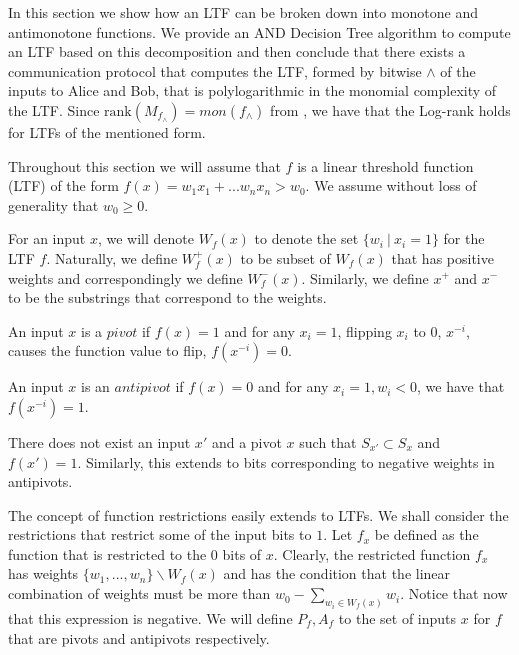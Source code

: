 In this section we show how an LTF can be broken down into monotone and antimonotone functions. We provide an AND Decision Tree algorithm to compute an LTF based on this decomposition and then conclude that there exists a communication protocol that computes the LTF, formed by bitwise $\wedge$ of the inputs to Alice and Bob, that is polylogarithmic in the monomial complexity of the LTF.  Since $\text{rank}({M_{f_{\wedge}}}) = mon(f_{\wedge})$ from \cite{Buhrman1999}, we have that the Log-rank holds for LTFs of the mentioned form.

Throughout this section we will assume that $f$ is a linear threshold function (LTF) of the form $f(x) = w_1x_1 + ... w_nx_n > w_0$. We assume  without loss of generality that $w_0 \geq 0$. 

For an input $x$, we will denote $W_f(x)$ to denote the set $\{w_i \ | \ x_i = 1\}$ for the LTF $f$. Naturally, we define $W^+_f(x)$ to be subset of $W_f(x)$ that has positive weights and correspondingly we define $W^-_f(x)$. Similarly, we define $x^+$ and $x^-$ to be the substrings that correspond to the weights.

\begin{definition}
	An input $x$ is a $pivot$ if $f(x) = 1$ and for any $x_i = 1$, flipping $x_i$ to $0$, $x^{-i}$, causes the function value to flip, $f(x^{-i}) = 0$. 
\end{definition}

\begin{definition}
	An input $x$ is an $antipivot$ if $f(x) = 0$ and for any $x_i = 1, w_i < 0$, we have that $f(x^{-i}) = 1$. 
\end{definition}

\begin{fact}\label{fact1}
	There does not exist an input $x'$ and a pivot $x$ such that $S_{x'} \subset S_x$ and $f(x') = 1$. Similarly, this extends to bits corresponding to negative weights in antipivots. 
\end{fact}

The concept of function restrictions easily extends to LTFs. We shall consider the restrictions that restrict some of the input bits to $1$. Let $f_x$ be defined as the function that is restricted to the $0$ bits of $x$. Clearly, the restricted function $f_x$ has weights $\{w_1, ..., w_n\} \backslash W_f(x)$ and has the condition that the linear combination of weights must be more than $w_0 - \sum_{w_i \in W_f(x)} w_i$. Notice that now that this expression is negative. We will define $P_f, A_f$ to the set of inputs $x$ for $f$ that are pivots and antipivots respectively. 

